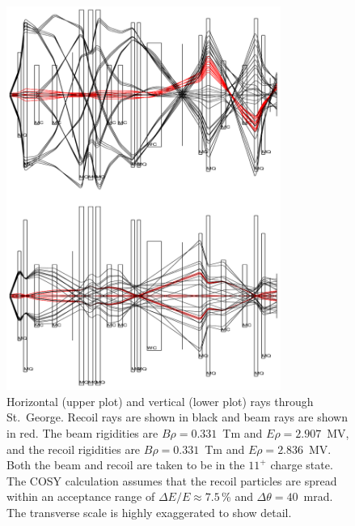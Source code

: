 \begin{figure}
    \begin{center}
        \centerline{
            \includegraphics[width=0.8\textwidth]{figures/raytrace.png}}
        \caption[Horizontal and vertical rays through St.\
            George]{Horizontal (upper plot) and vertical (lower plot)
            rays through St.\ George. Recoil \nuc{41}{Sc} rays are shown
            in black and beam \nuc{40}{Ca} rays are shown in red.
            The beam rigidities are $B\rho = 0.331$~Tm and $E\rho =
            2.907$~MV, and the recoil rigidities are $B\rho = 0.331$~Tm
            and $E\rho = 2.836$~MV. Both the beam and recoil are taken
            to be in the $11^+$ charge state. The COSY calculation
            assumes that the recoil particles are spread within an
            acceptance range of $\Delta E/E \approx7.5$\,\% and
            $\Delta\theta = 40$~mrad. The transverse scale is highly
            exaggerated to show detail.}
        \label{fig:raytrace}
    \end{center}
\end{figure}


